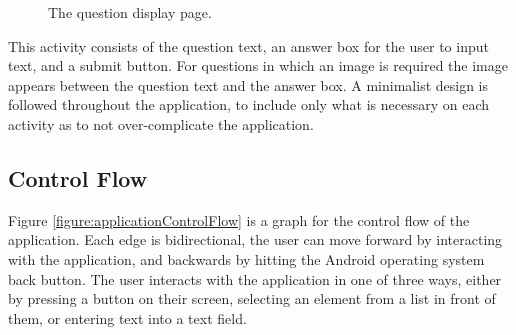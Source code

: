 \documentclass{article}
\begin{document}
\begin{figure}[H]
	\centering
	\caption{The question display page.}
	\label{figure:applicationQuestionPage}
\end{figure}

This activity consists of the question text, an answer box for the user to input text, and a submit button. For questions in which an image is required the image appears between the question text and the answer box. A minimalist design is followed throughout the application, to include only what is necessary on each activity as to not over-complicate the application. \par

\subsection{Control Flow}

Figure \ref{figure:applicationControlFlow} is a graph for the control flow of the application. Each edge is bidirectional, the user can move forward by interacting with the application, and backwards by hitting the Android operating system back button. The user interacts with the application in one of three ways, either by pressing a button on their screen, selecting an element from a list in front of them, or entering text into a text field. \par
\end{document}
